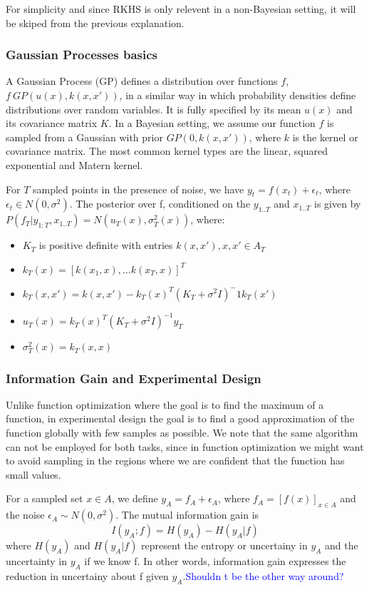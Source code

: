 \documentclass[10pt,journal,a4paper]{IEEEtran}
\begin{document}
For simplicity and since RKHS is only relevent in a non-Bayesian setting, it will be skiped from the previous explanation.

\subsubsection{Gaussian Processes basics}
A Gaussian Process (GP) defines a distribution over functions $f$, $f ~ GP(u(x), k(x,x'))$, in a similar way in which probability densities define distributions over random variables. It is fully specified by its mean $u(x)$ and its covariance matrix $K$. In a Bayesian setting, we assume our function $f$ is sampled from a Gaussian with prior $GP(0, k(x,x'))$, where $k$ is the kernel or covariance matrix. The most common kernel types are the linear, squared exponential and Matern kernel.

For $T$ sampled points in the presence of noise, we have $y_t = f(x_t) + \epsilon_t$, where $\epsilon_t \in N(0,\sigma^2)$. The posterior over f, conditioned on the $y_{1..T}$ and $x_{1..T}$ is given by
$P(f_T| y_{1:T},x_{1..T}) = N(u_T(x), \sigma_T^2(x))$, where: 
\begin{itemize}
	\item $K_T$ is positive definite with entries $k(x,x'), x,x' \in A_T$   
	\item $k_T(x) = [k(x_1,x),...k(x_T,x)]^T$	
	\item $k_{T}(x,x') = k(x,x') - k_T(x)^T(K_T+\sigma^2I)^-1k_T(x')$
	\item $u_{T}(x) = k_{T}(x)^{T}(K_T + \sigma^2I)^{-1} y_{T}$
	\item $\sigma_T^2(x) =  k_{T}(x,x)$
\end{itemize}

\subsubsection{Information Gain and Experimental Design}

Unlike function optimization where the goal is to find the maximum of a function, in experimental design the goal is to find a good approximation of the function globally with few samples as possible. We note that the same algorithm can not be employed for both tasks, since in function optimization we might want to avoid sampling in the regions where we are confident that the function has small values.

For a sampled set $x\in A$, we define $y_A = f_A + \epsilon_A$, where  $f_A=[f(x)]_{x \in A}$ and the noise $\epsilon_A \sim N(0,\sigma^2)$.
 The mutual information gain is
\begin{equation}
	I(y_A; f) = H(y_A) - H(y_A| f)
\end{equation}
where $H(y_A)$ and $H(y_A|f)$ represent the entropy or uncertainy in $y_A$ and 
the uncertainty in $y_A$ if we know f. In other words, information gain expresses the reduction in uncertainy about f given $y_A$.\textcolor{blue}{Shouldn t be the other way around?}
\end{document}
